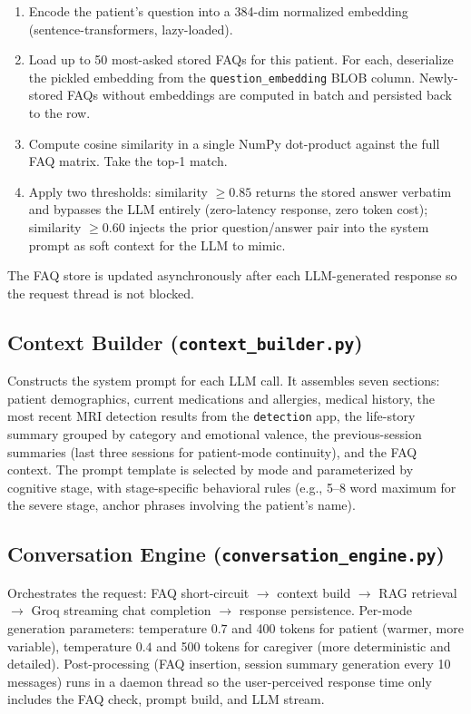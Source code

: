 \documentclass[11pt, a4paper]{article}
\begin{document}
\begin{enumerate}
    \item Encode the patient's question into a 384-dim normalized embedding (sentence-transformers, lazy-loaded).
    \item Load up to 50 most-asked stored FAQs for this patient. For each, deserialize the pickled embedding from the \texttt{question\_embedding} BLOB column. Newly-stored FAQs without embeddings are computed in batch and persisted back to the row.
    \item Compute cosine similarity in a single NumPy dot-product against the full FAQ matrix. Take the top-1 match.
    \item Apply two thresholds: similarity $\geq 0.85$ returns the stored answer verbatim and bypasses the LLM entirely (zero-latency response, zero token cost); similarity $\geq 0.60$ injects the prior question/answer pair into the system prompt as soft context for the LLM to mimic.
\end{enumerate}

The FAQ store is updated asynchronously after each LLM-generated response so the request thread is not blocked.

\subsection{Context Builder (\texttt{context\_builder.py})}

Constructs the system prompt for each LLM call. It assembles seven sections: patient demographics, current medications and allergies, medical history, the most recent MRI detection results from the \texttt{detection} app, the life-story summary grouped by category and emotional valence, the previous-session summaries (last three sessions for patient-mode continuity), and the FAQ context. The prompt template is selected by mode and parameterized by cognitive stage, with stage-specific behavioral rules (e.g., 5--8 word maximum for the severe stage, anchor phrases involving the patient's name).

\subsection{Conversation Engine (\texttt{conversation\_engine.py})}

Orchestrates the request: FAQ short-circuit $\to$ context build $\to$ RAG retrieval $\to$ Groq streaming chat completion $\to$ response persistence. Per-mode generation parameters: temperature $0.7$ and 400 tokens for patient (warmer, more variable), temperature $0.4$ and 500 tokens for caregiver (more deterministic and detailed). Post-processing (FAQ insertion, session summary generation every 10 messages) runs in a daemon thread so the user-perceived response time only includes the FAQ check, prompt build, and LLM stream.
\end{document}
